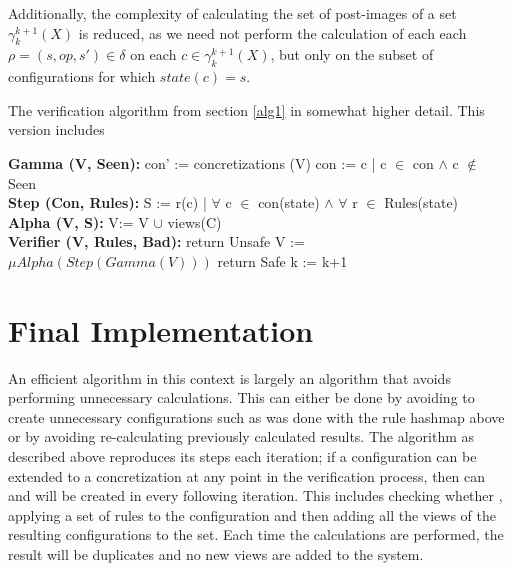 Additionally, the complexity of calculating the set of post-images of a set $\gamma_k^{k+1}(X)$ is reduced, as we need not perform the calculation of each each $\rho = (s, op, s') \in \delta$ on each $c \in \gamma_k^{k+1}(X)$, but only on the subset of configurations for which $state(c) = s$.


\begin{algorithm}
  \caption{The verification algorithm from section \ref{alg1} in somewhat higher detail. This version includes }\label{euclid}
  \begin{algorithmic}[1]
    \State \textbf{Gamma (V, Seen):}
    \State \hspace{6 mm} con' := concretizations (V)
    \State \hspace{6 mm} con  := c | c $\in$ con $\land$ c $\notin$ Seen
    \\
    \State \textbf{Step (Con, Rules):}
    \State \hspace{6 mm} S := r(c) | $\forall$ c $\in$ con(state) $\land$ $\forall$ r $\in$ Rules(state)
    \EndFor
    \\
    \State \textbf{Alpha (V, S):}
    \State \hspace{6 mm} V:= V $\cup$ views(C)
    \\
    \State \textbf{Verifier (V, Rules, Bad):}
        \State return Unsafe
        \EndIf
        \State V := $\mu Alpha(Step(Gamma(V)))$
        \State return Safe
        \EndIf
        \State k := k+1
      \EndFor
\end{algorithmic}
\end{algorithm}



\newpage
\section{Final Implementation}
An efficient algorithm in this context is largely an algorithm that avoids performing unnecessary calculations. This can either be done by avoiding to create unnecessary configurations such as was done with the rule hashmap above or by avoiding re-calculating previously calculated results. The algorithm as described above reproduces its steps each iteration; if a configuration  can be extended to a concretization  at any point in the verification process, then  can and will be created in every following iteration. This includes checking whether , applying a set of rules to the configuration and then adding all the views of the resulting configurations to the set. Each time the calculations are performed, the result will be duplicates and no new views are added to the system.

